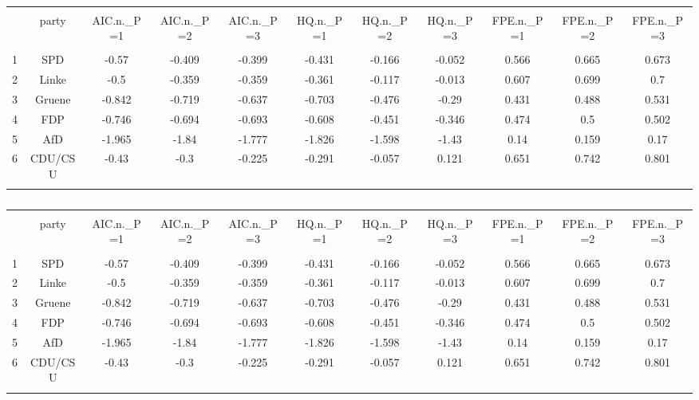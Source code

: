 
\begin{table}[!htbp] \centering 
  \caption{} 
  \label{} 
\begin{tabular}{@{\extracolsep{5pt}} ccccccccccc} 
\\[-1.8ex]\hline 
\hline \\[-1.8ex] 
 & party & AIC.n.\_P=1 & AIC.n.\_P=2 & AIC.n.\_P=3 & HQ.n.\_P=1 & HQ.n.\_P=2 & HQ.n.\_P=3 & FPE.n.\_P=1 & FPE.n.\_P=2 & FPE.n.\_P=3 \\ 
\hline \\[-1.8ex] 
1 & SPD & -0.57 & -0.409 & -0.399 & -0.431 & -0.166 & -0.052 & 0.566 & 0.665 & 0.673 \\ 
2 & Linke & -0.5 & -0.359 & -0.359 & -0.361 & -0.117 & -0.013 & 0.607 & 0.699 & 0.7 \\ 
3 & Gruene & -0.842 & -0.719 & -0.637 & -0.703 & -0.476 & -0.29 & 0.431 & 0.488 & 0.531 \\ 
4 & FDP & -0.746 & -0.694 & -0.693 & -0.608 & -0.451 & -0.346 & 0.474 & 0.5 & 0.502 \\ 
5 & AfD & -1.965 & -1.84 & -1.777 & -1.826 & -1.598 & -1.43 & 0.14 & 0.159 & 0.17 \\ 
6 & CDU/CSU & -0.43 & -0.3 & -0.225 & -0.291 & -0.057 & 0.121 & 0.651 & 0.742 & 0.801 \\ 
\hline \\[-1.8ex] 
\end{tabular} 
\end{table}  

\begin{table}[!htbp] \centering 
  \caption{} 
  \label{} 
\begin{tabular}{@{\extracolsep{5pt}} ccccccccccc} 
\\[-1.8ex]\hline 
\hline \\[-1.8ex] 
 & party & AIC.n.\_P=1 & AIC.n.\_P=2 & AIC.n.\_P=3 & HQ.n.\_P=1 & HQ.n.\_P=2 & HQ.n.\_P=3 & FPE.n.\_P=1 & FPE.n.\_P=2 & FPE.n.\_P=3 \\ 
\hline \\[-1.8ex] 
1 & SPD & -0.57 & -0.409 & -0.399 & -0.431 & -0.166 & -0.052 & 0.566 & 0.665 & 0.673 \\ 
2 & Linke & -0.5 & -0.359 & -0.359 & -0.361 & -0.117 & -0.013 & 0.607 & 0.699 & 0.7 \\ 
3 & Gruene & -0.842 & -0.719 & -0.637 & -0.703 & -0.476 & -0.29 & 0.431 & 0.488 & 0.531 \\ 
4 & FDP & -0.746 & -0.694 & -0.693 & -0.608 & -0.451 & -0.346 & 0.474 & 0.5 & 0.502 \\ 
5 & AfD & -1.965 & -1.84 & -1.777 & -1.826 & -1.598 & -1.43 & 0.14 & 0.159 & 0.17 \\ 
6 & CDU/CSU & -0.43 & -0.3 & -0.225 & -0.291 & -0.057 & 0.121 & 0.651 & 0.742 & 0.801 \\ 
\hline \\[-1.8ex] 
\end{tabular} 
\end{table}  
